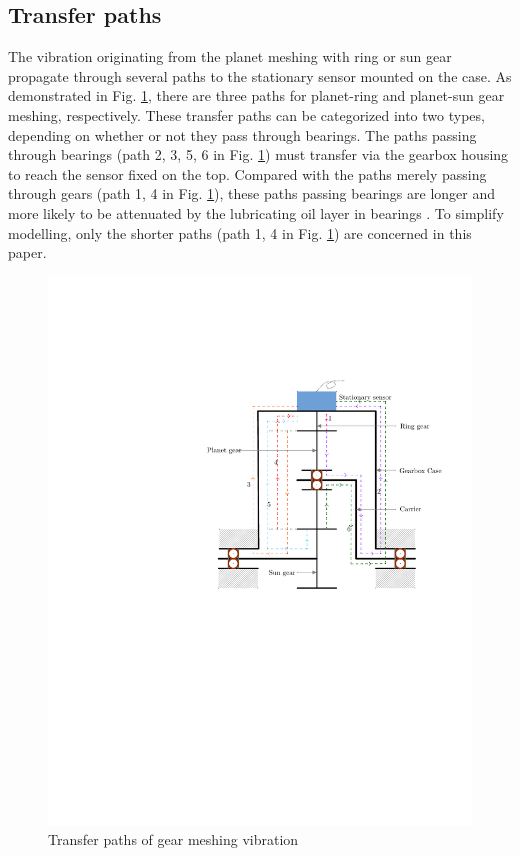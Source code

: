 \documentclass[a4paper]{cas-sc}%
\begin{document}
\subsection{Transfer paths}
\par The vibration originating from the planet meshing with ring or sun gear propagate through several paths to the stationary sensor mounted on the case. As demonstrated in Fig. \ref{fig:transfer_path}, there are three paths for planet-ring and planet-sun gear meshing, respectively. These transfer paths can be categorized into two types, depending on whether or not they pass through bearings. The paths passing through bearings (path 2, 3, 5, 6 in Fig. \ref{fig:transfer_path}) must transfer via the gearbox housing to reach the sensor fixed on the top. Compared with the paths merely passing through gears (path 1, 4 in Fig. \ref{fig:transfer_path}), these paths passing bearings are longer and more likely to be attenuated by the lubricating oil layer in bearings \cite{Feng2012}. To simplify modelling, only the shorter paths (path 1, 4 in Fig. \ref{fig:transfer_path}) are concerned in this paper.
\begin{figure}[pos=htbp]
    \centering
    \includegraphics[scale=0.5]{transfer_path.pdf}
    \caption{Transfer paths of gear meshing vibration\label{fig:transfer_path}}
\end{figure}
\end{document}
